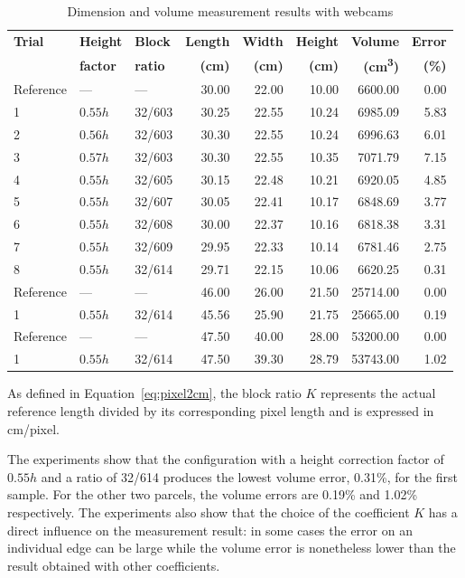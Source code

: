 \begin{table}[htbp]
\centering
\caption{Dimension and volume measurement results with webcams}
\label{tab:webcamdim}
\footnotesize
\setlength{\tabcolsep}{4pt}
\begin{tabular}{lllrrrrr}
\hline
\textbf{Trial} & \textbf{Height} & \textbf{Block} & \textbf{Length} & \textbf{Width} & \textbf{Height} & \textbf{Volume} & \textbf{Error} \\
 & \textbf{factor} & \textbf{ratio} & \textbf{(cm)} & \textbf{(cm)} & \textbf{(cm)} & \textbf{(cm\textsuperscript{3})} & \textbf{(\%)} \\
\hline
Reference & --- & --- & 30.00 & 22.00 & 10.00 & 6600.00 & 0.00 \\
1 & $0.55h$ & 32/603 & 30.25 & 22.55 & 10.24 & 6985.09 & 5.83 \\
2 & $0.56h$ & 32/603 & 30.30 & 22.55 & 10.24 & 6996.63 & 6.01 \\
3 & $0.57h$ & 32/603 & 30.30 & 22.55 & 10.35 & 7071.79 & 7.15 \\
4 & $0.55h$ & 32/605 & 30.15 & 22.48 & 10.21 & 6920.05 & 4.85 \\
5 & $0.55h$ & 32/607 & 30.05 & 22.41 & 10.17 & 6848.69 & 3.77 \\
6 & $0.55h$ & 32/608 & 30.00 & 22.37 & 10.16 & 6818.38 & 3.31 \\
7 & $0.55h$ & 32/609 & 29.95 & 22.33 & 10.14 & 6781.46 & 2.75 \\
8 & $0.55h$ & 32/614 & 29.71 & 22.15 & 10.06 & 6620.25 & 0.31 \\
\hline
Reference & --- & --- & 46.00 & 26.00 & 21.50 & 25714.00 & 0.00 \\
1 & $0.55h$ & 32/614 & 45.56 & 25.90 & 21.75 & 25665.00 & 0.19 \\
\hline
Reference & --- & --- & 47.50 & 40.00 & 28.00 & 53200.00 & 0.00 \\
1 & $0.55h$ & 32/614 & 47.50 & 39.30 & 28.79 & 53743.00 & 1.02 \\
\hline
\end{tabular}
\end{table}

As defined in Equation~\eqref{eq:pixel2cm}, the block ratio $K$ represents the actual reference length divided by its corresponding pixel length and is expressed in cm/pixel.

The experiments show that the configuration with a height correction factor of $0.55h$ and a ratio of 32/614 produces the lowest volume error, 0.31\%, for the first sample. For the other two parcels, the volume errors are 0.19\% and 1.02\% respectively. The experiments also show that the choice of the coefficient $K$ has a direct influence on the measurement result: in some cases the error on an individual edge can be large while the volume error is nonetheless lower than the result obtained with other coefficients.

